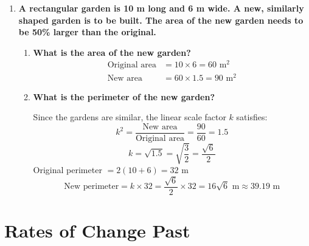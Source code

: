 \documentclass[12pt]{article}
\begin{document}
\begin{enumerate}[resume]
    \item \textbf{A rectangular garden is 10 m long and 6 m wide. A new, similarly shaped garden is to be built. The area of the new garden needs to be 50\% larger than the original.}
    \begin{enumerate}[label=(\alph*)]
        \item \textbf{What is the area of the new garden?}
        \begin{align*}
            \text{Original area} &= 10 \times 6 = 60 \text{ m}^2 \\
            \text{New area} &= 60 \times 1.5 = 90 \text{ m}^2
        \end{align*}
        
        \item \textbf{What is the perimeter of the new garden?}
        
        Since the gardens are similar, the linear scale factor \(k\) satisfies:
        \[
        k^2 = \frac{\text{New area}}{\text{Original area}} = \frac{90}{60} = 1.5
        \]
        \[
        k = \sqrt{1.5} = \sqrt{\frac{3}{2}} = \frac{\sqrt{6}}{2}
        \]
        Original perimeter \(= 2(10 + 6) = 32 \text{ m}\)
        \[
        \text{New perimeter} = k \times 32 = \frac{\sqrt{6}}{2} \times 32 = 16\sqrt{6} \text{ m} \approx 39.19 \text{ m}
        \]
    \end{enumerate}
\end{enumerate}

\section*{Rates of Change Past}
\end{document}
